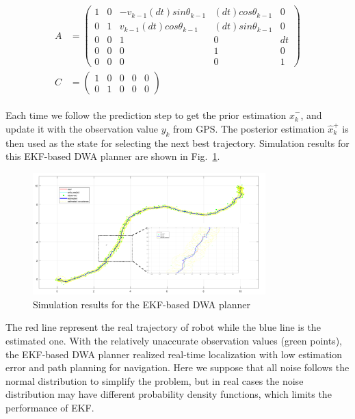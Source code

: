 \documentclass[conference]{IEEEtran}
\begin{document}
	\begin{equation}
	\begin{split}
	\begin{aligned}
	A&=\begin{pmatrix}
	1 &0  &-v_{k-1}(dt)sin\theta _{k-1}  &(dt)cos\theta _{k-1}  &0 \\ 
	0 &1  &v_{k-1}(dt)cos\theta _{k-1}  &(dt)sin\theta _{k-1}  &0 \\ 
	0 &0  &1  &0  &dt \\ 
	0 &0  &0  &1  &0 \\ 
	0 &0  &0  &0  &1 
	\end{pmatrix}\\
	C&=\begin{pmatrix}
	1 &0  &0  &0  &0 \\ 
	0 &1  &0  &0  &0 
	\end{pmatrix}
	\label{eq31}	
	\end{aligned}
	\end{split}
	\end{equation}
	
	Each time we follow the prediction step to get the prior estimation $\hat{x}_{k}^{-}$, and update it with the observation value $y_{k}$ from GPS. The posterior estimation $\hat{x}_{k}^{+}$ is then used as the state for selecting the next best trajectory. Simulation results for this EKF-based DWA planner are shown in Fig.~\ref{fig7}.
	
	\begin{figure}[H]
		\centering
		\includegraphics[width=9cm]{fig7.png}
		\caption{Simulation results for the EKF-based DWA planner}
		\label{fig7}
	\end{figure}

	The red line represent the real trajectory of robot while the blue line is the estimated one. With the relatively unaccurate observation values (green points), the EKF-based DWA planner realized real-time localization with low estimation error and path planning for navigation. Here we suppose that all noise follows the normal distribution to simplify the problem, but in real cases the noise distribution may have different probability density functions, which limits the performance of EKF.
	
\end{document}
